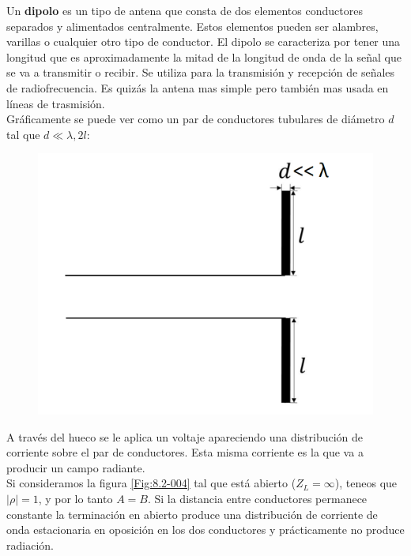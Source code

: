 \documentclass[12pt]{article}
\begin{document}
Un \textbf{dipolo} es un tipo de antena que consta de dos elementos conductores separados y alimentados centralmente. Estos elementos pueden ser alambres, varillas o cualquier otro tipo de conductor. El dipolo se caracteriza por tener una longitud que es aproximadamente la mitad de la longitud de onda de la señal que se va a transmitir o recibir. Se utiliza para la transmisión y recepción de señales de radiofrecuencia. Es quizás la antena mas simple pero también mas usada en líneas de trasmisión. \\

Gráficamente se puede ver como un par de conductores tubulares de diámetro $d$ tal que $d\ll \lambda,2l$:


\begin{figure}[h!] \centering
\includegraphics[scale=0.5]{lineatrasmision4.png}
\end{figure}

A través del hueco se le aplica un voltaje apareciendo una distribución de corriente sobre el par de conductores. Esta misma corriente es la que va a producir un campo radiante. \\

Si consideramos la figura \ref{Fig:8.2-004} tal que está abierto ($Z_L = \infty$), teneos que $|\rho| = 1$, y por lo tanto $A=B$. Si la distancia entre conductores permanece constante la terminación en abierto produce una distribución de corriente de onda estacionaria en oposición en los dos conductores y prácticamente no produce radiación. \\
\end{document}
